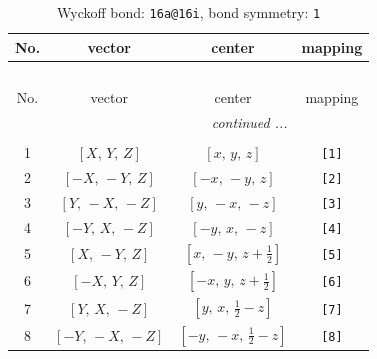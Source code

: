 \documentclass[fleqn,8pt]{jsarticle}
\begin{document}
\begin{longtable}{cccc}
\caption{Wyckoff bond: {\tt 16a@16i}, bond symmetry: {\tt 1}}
 \\
 \hline \hline
No. & vector & center & mapping \\ \hline \endfirsthead

\multicolumn{3}{l}{\tablename\ \thetable{}} \\
 \hline \hline
No. & vector & center & mapping \\ \hline \endhead

 \hline \hline
\multicolumn{3}{r}{\footnotesize\it continued ...} \\ \endfoot

 \hline \hline
\multicolumn{3}{r}{} \\ \endlastfoot

1 & $\left[ X,\, Y,\, Z \right]$ & $\left[ x,\, y,\, z \right]$ & {\tt [1]} \\ \hline
2 & $\left[ - X,\, - Y,\, Z \right]$ & $\left[ - x,\, - y,\, z \right]$ & {\tt [2]} \\ \hline
3 & $\left[ Y,\, - X,\, - Z \right]$ & $\left[ y,\, - x,\, - z \right]$ & {\tt [3]} \\ \hline
4 & $\left[ - Y,\, X,\, - Z \right]$ & $\left[ - y,\, x,\, - z \right]$ & {\tt [4]} \\ \hline
5 & $\left[ X,\, - Y,\, Z \right]$ & $\left[ x,\, - y,\, z + \frac{1}{2} \right]$ & {\tt [5]} \\ \hline
6 & $\left[ - X,\, Y,\, Z \right]$ & $\left[ - x,\, y,\, z + \frac{1}{2} \right]$ & {\tt [6]} \\ \hline
7 & $\left[ Y,\, X,\, - Z \right]$ & $\left[ y,\, x,\, \frac{1}{2} - z \right]$ & {\tt [7]} \\ \hline
8 & $\left[ - Y,\, - X,\, - Z \right]$ & $\left[ - y,\, - x,\, \frac{1}{2} - z \right]$ & {\tt [8]} \\
\end{longtable}
\end{document}
